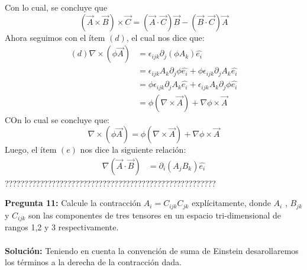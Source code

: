 \documentclass[11pt,letterpaper]{article}
\begin{document}
Con lo cual, se concluye que
\begin{equation}
    (\vec{A}\times\vec{B}) \times \vec{C} = (\vec{A}\cdot\vec{C})\vec{B} - (\vec{B}\cdot\vec{C})\vec{A}
\end{equation}
Ahora seguimos con el ítem $(d)$, el cual nos dice que:
\begin{align*}
    (d) \nabla \times (\phi\vec{A})  & = \epsilon_{ijk}\partial_j(\phi A_k)\hat{e_i}  \\
    & = \epsilon_{ijk}A_k\partial_j \phi \hat{e_i} + \phi  \epsilon_{ijk}\partial_j A_k\hat{e_i} \\
    & = \phi  \epsilon_{ijk}\partial_j A_k\hat{e_i} + \epsilon_{ijk}A_k\partial_j \phi \hat{e_i} \\
    & = \phi (\nabla \times \vec{A}) + \nabla \phi \times \vec{A}
\end{align*}
COn lo cual se concluye que: 
\begin{equation}
    \nabla \times (\phi\vec{A})  = \phi (\nabla \times \vec{A}) + \nabla \phi \times \vec{A}
\end{equation}
Luego, el ítem $(e)$ nos dice la siguiente relación:
\begin{align*}
    \nabla (\vec{A}\cdot\vec{B}) & = \partial_i(A_jB_k)\hat{e_i}
\end{align*}
??????????????????????????????????????????????????????


\textbf{Pregunta 11:} Calcule la contracción $A_i=C_{ijk}C_{jk}$ explícitamente, donde $A_{i}$ , $B_{jk}$ y $C_{ijk}$ son las componentes de tres tensores en un espacio tri-dimensional de rangos 1,2 y 3 respectivamente. \\
\\
\textbf{Solución:} Teniendo en cuenta la convención de suma de Einstein desarollaremos los términos a la derecha de la contracción dada.
\end{document}
